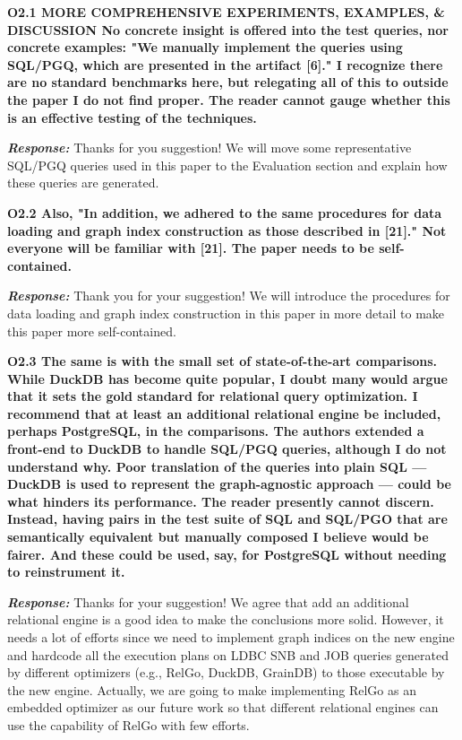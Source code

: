 \textbf{O2.1 MORE COMPREHENSIVE EXPERIMENTS, EXAMPLES, \& DISCUSSION
No concrete insight is offered into the test queries, nor concrete examples: "We manually implement the queries using SQL/PGQ, which are presented in the artifact [6]." I recognize there are no standard benchmarks here, but relegating all of this to outside the paper I do not find proper. The reader cannot gauge whether this is an effective testing of the techniques. }

\textbf{\textit{Response: }}
Thanks for you suggestion! We will move some representative SQL/PGQ queries used in this paper to the Evaluation section and explain how these queries are generated.


\textbf{
O2.2 Also, "In addition, we adhered to the same procedures for data loading and graph index construction as those described in [21]." Not everyone will be familiar with [21]. The paper needs to be self-contained. }

\textbf{\textit{Response: }}
Thank you for your suggestion! We will introduce the procedures for data loading and graph index construction in this paper in more detail to make this paper more self-contained.

\textbf{ 
O2.3 The same is with the small set of state-of-the-art comparisons. While DuckDB has become quite popular, I doubt many would argue that it sets the gold standard for relational query optimization. I recommend that at least an additional relational engine be included, perhaps PostgreSQL, in the comparisons. The authors extended a front-end to DuckDB to handle SQL/PGQ queries, although I do not understand why. Poor translation of the queries into plain SQL — DuckDB is used to represent the graph-agnostic approach — could be what hinders its performance. The reader presently cannot discern. Instead, having pairs in the test suite of SQL and SQL/PGO that are semantically equivalent but manually composed I believe would be fairer. And these could be used, say, for PostgreSQL without needing to reinstrument it.}

\textbf{\textit{Response: }}
Thanks for your suggestion! We agree that add an additional relational engine is a good idea to make the conclusions more solid. However, it needs a lot of efforts since we need to implement graph indices on the new engine and hardcode all the execution plans on LDBC SNB and JOB queries generated by different optimizers (e.g., RelGo, DuckDB, GrainDB) to those executable by the new engine. Actually, we are going to make implementing RelGo as an embedded optimizer as our future work so that different relational engines can use the capability of RelGo with few efforts.


